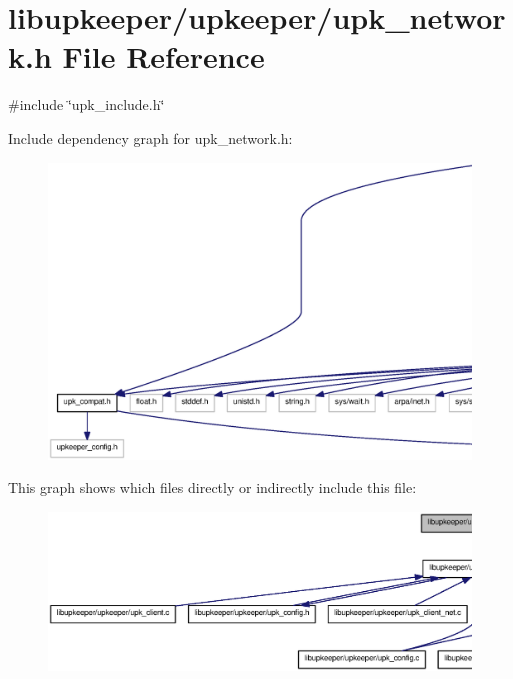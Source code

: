 \section{libupkeeper/upkeeper/upk\_\-network.h File Reference}
\label{upk__network_8h}
{\ttfamily \#include \char`\"{}upk\_\-include.h\char`\"{}}\par
Include dependency graph for upk\_\-network.h:\nopagebreak
\begin{figure}[H]
\begin{center}
\leavevmode
\includegraphics[width=400pt]{upk__network_8h__incl}
\end{center}
\end{figure}
This graph shows which files directly or indirectly include this file:
\nopagebreak
\begin{figure}[H]
\begin{center}
\leavevmode
\includegraphics[width=400pt]{upk__network_8h__dep__incl}
\end{center}
\end{figure}
